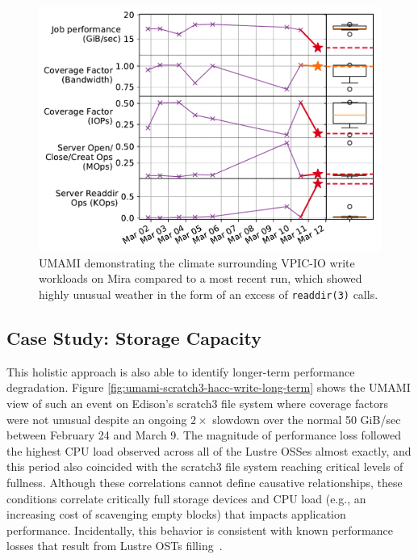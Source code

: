 \begin{figure}[t]
    \centering
    \includegraphics[width=1.0\columnwidth]{figs/umami-mira-fs1-vpic-write.pdf}
    \caption{UMAMI demonstrating the climate surrounding VPIC-IO write workloads on Mira compared to a most recent run, which showed highly unusual weather in the form of an excess of \texttt{readdir(3)} calls.
    }
    \label{fig:umami-mira-fs1-vpic-write}
\vspace{-.2in}
\end{figure}

\subsection{Case Study: Storage Capacity}

This holistic approach is also able to identify longer-term performance degradation.
Figure \ref{fig:umami-scratch3-hacc-write-long-term} shows the UMAMI view of such an event on Edison's scratch3 file system where coverage factors were not unusual despite an ongoing $2\times$ slowdown over the normal 50 GiB/sec between February 24 and March 9.
The magnitude of performance loss followed the highest CPU load observed across all of the Lustre OSSes almost exactly, and this period also coincided with the scratch3 file system reaching critical levels of fullness.
Although these correlations cannot define causative relationships, these conditions correlate critically full storage devices and CPU load (e.g., an increasing cost of scavenging empty blocks) that impacts application performance.
Incidentally, this behavior is consistent with known performance losses that result from Lustre OSTs filling~\cite{oral2014best}.  
 
